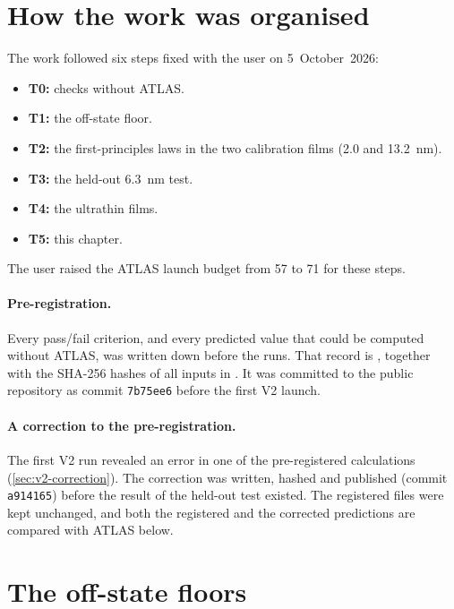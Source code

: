 \section{How the work was organised}
\label{sec:v2-method}

The work followed six steps fixed with the user on 5~October~2026:
\begin{itemize}
\item \textbf{T0:} checks without ATLAS.
\item \textbf{T1:} the off-state floor.
\item \textbf{T2:} the first-principles laws in the two calibration films (2.0 and 13.2~nm).
\item \textbf{T3:} the held-out 6.3~nm test.
\item \textbf{T4:} the ultrathin films.
\item \textbf{T5:} this chapter.
\end{itemize}
The user raised the ATLAS launch budget from 57 to 71 for these steps.

\paragraph{Pre-registration.} Every pass/fail criterion, and every predicted value that could be computed without
ATLAS, was written down before the runs. That record is , together with
the SHA-256 hashes of all inputs in . It was committed to the public repository as commit
\texttt{7b75ee6} before the first V2 launch.

\paragraph{A correction to the pre-registration.} The first V2 run revealed an error in one of the pre-registered
calculations (\cref{sec:v2-correction}). The correction was written, hashed and published (commit \texttt{a914165})
before the result of the held-out test existed. The registered files were kept unchanged, and both the registered and
the corrected predictions are compared with ATLAS below.

\section{The off-state floors}
\label{sec:v2-floor}

